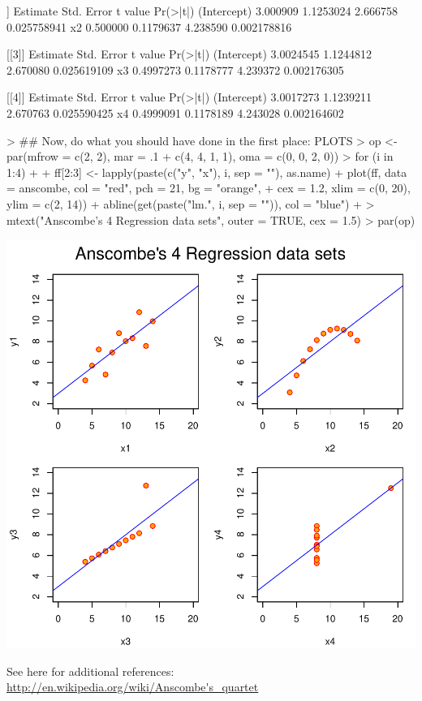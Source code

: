\documentclass[12pt,letterpaper,final]{article}
\begin{document}
\begin{Schunk}
\begin{Soutput}
[[2]]
            Estimate Std. Error  t value    Pr(>|t|)
(Intercept) 3.000909  1.1253024 2.666758 0.025758941
x2          0.500000  0.1179637 4.238590 0.002178816

[[3]]
             Estimate Std. Error  t value    Pr(>|t|)
(Intercept) 3.0024545  1.1244812 2.670080 0.025619109
x3          0.4997273  0.1178777 4.239372 0.002176305

[[4]]
             Estimate Std. Error  t value    Pr(>|t|)
(Intercept) 3.0017273  1.1239211 2.670763 0.025590425
x4          0.4999091  0.1178189 4.243028 0.002164602
\end{Soutput}
\begin{Sinput}
> ## Now, do what you should have done in the first place: PLOTS 
> op <- par(mfrow = c(2, 2), mar = .1 + c(4, 4, 1, 1), oma = c(0, 0, 2, 0)) 
> for (i in 1:4) 
+ { 
+   ff[2:3] <- lapply(paste(c("y", "x"), i, sep = ""), as.name) 
+   plot(ff, data = anscombe, col = "red", pch = 21, bg = "orange", 
+        cex = 1.2, xlim = c(0, 20), ylim = c(2, 14)) 
+   abline(get(paste("lm.", i, sep = "")), col = "blue") 
+ } 
> mtext("Anscombe's 4 Regression data sets", outer = TRUE, cex = 1.5) 
> par(op)
\end{Sinput}
\end{Schunk}
\includegraphics{lect_main-003}

See here for additional references: \\
\url{http://en.wikipedia.org/wiki/Anscombe's_quartet}
\end{document}
